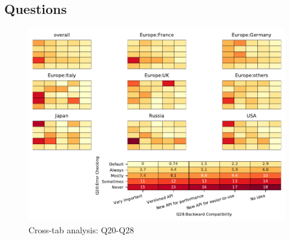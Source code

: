 
\subsection{Questions}


\begin{figure}
\begin{center}
\includegraphics[width=12cm]{../pdfs/Q20-Q28.pdf}
\caption{Cross-tab analysis: Q20-Q28}
\label{fig:Q20-Q28}
\end{center}
\end{figure}
